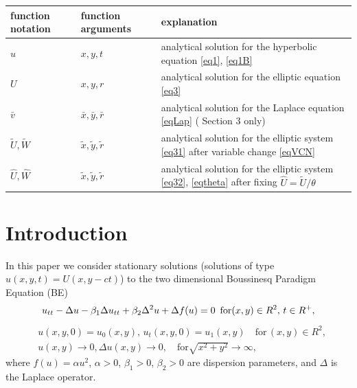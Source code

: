 \documentclass[12pt]{article}
\theoremstyle{theorem}
\theoremstyle{defi}
\begin{document}
\begin{center}
\begin{table}[ht]
		\begin{tabular}{|C{1.6cm}|C{1.9cm}|C{7.3cm}|}
   			\hline
			\hline
    function notation  & function arguments   &  explanation  \\
               	 \hline
    $u$          & $x,y,t$                            &  analytical solution for the hyperbolic equation \eqref{eq1}, \eqref{eq1B} \\
			\hline 	
      $U$        &   $x, y, r$                           & analytical solution for the elliptic equation \eqref{eq3} \\
			\hline 	
      $\bar v$        &  $\bar x, \bar y, \bar r$  & analytical solution for the Laplace equation \eqref{eqLap} ( Section 3 only)  \\
			\hline 	
     $\tilde U, \tilde W$ & $ \tilde x, \tilde y, \tilde r$  &  analytical solution for the elliptic system \eqref{eq31} after variable change \eqref{eqVCN} \\
			\hline 	
     $\widehat U, \widehat W$ & $\tilde x, \tilde y, \tilde r$  &  analytical solution for the elliptic system \eqref{eq32}, \eqref{eqtheta} after fixing $ \widehat U = \tilde U / \theta $ \\
		   \hline
	          \hline
		\end{tabular}
\end{table}
\end{center}

\section{Introduction}

In this paper we consider stationary solutions (solutions of type  $u(x,y,t)=U(x,y - ct)$) to the two dimensional Boussinesq Paradigm Equation (BE)
\begin{equation}
u_{tt} - \Delta u -\beta_1  \Delta u_{tt} +\beta_2 \Delta ^2 u + \Delta f(u)=0 \enskip \text{for} (x,y) \in R^2, \, t\in R^+ ,\label{eq1}
\end{equation}
\begin{equation}\label{eq1B}
\begin{split}
&u(x,y,0)=u_0(x,y), \, u_t(x,y,0)=u_1(x,y)   \quad\text{for} \, (x,y) \in R^2, \\
&u(x,y) \rightarrow 0,  \Delta u(x,y) \rightarrow 0 ,  \quad \text{for}  \sqrt{x^2 + y^2} \rightarrow \infty,
\end{split}
\end{equation}
where   $f(u)=\alpha u^2$,  $\alpha>0$, $\beta_1>0$, $\beta_2>0$  are dispersion parameters, and $\Delta$ is the Laplace operator.
\end{document}
